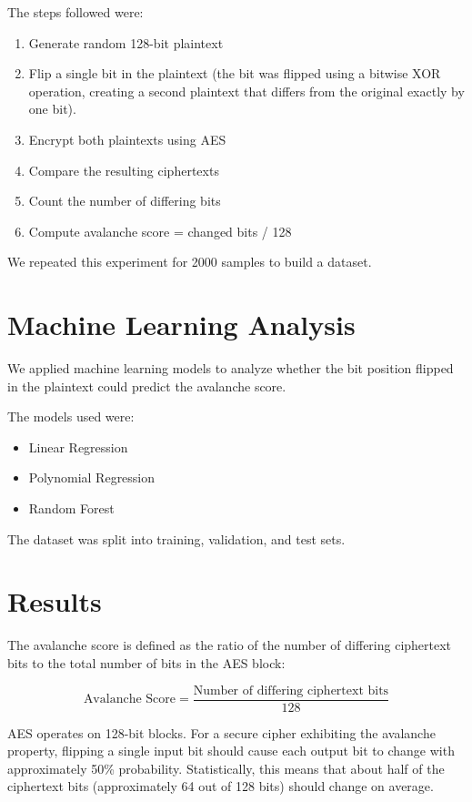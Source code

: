 \documentclass{article}
\begin{document}
The steps followed were:

\begin{enumerate}
\item Generate random 128-bit plaintext
\item Flip a single bit in the plaintext (the bit was flipped using a bitwise XOR operation, creating a second plaintext that differs from the original exactly by one bit).
\item Encrypt both plaintexts using AES
\item Compare the resulting ciphertexts
\item Count the number of differing bits
\item Compute avalanche score = changed bits / 128
\end{enumerate}

We repeated this experiment for 2000 samples to build a dataset.

\section{Machine Learning Analysis}

We applied machine learning models to analyze whether the bit position flipped in the plaintext could predict the avalanche score.

The models used were:

\begin{itemize}
\item Linear Regression
\item Polynomial Regression
\item Random Forest
\end{itemize}

The dataset was split into training, validation, and test sets.

\section{Results}

The avalanche score is defined as the ratio of the number of differing ciphertext bits to the total number of bits in the AES block:

\[
\text{Avalanche Score} = \frac{\text{Number of differing ciphertext bits}}{128}
\]

AES operates on 128-bit blocks. For a secure cipher exhibiting the avalanche property, flipping a single input bit should cause each output bit to change with approximately 50\% probability. Statistically, this means that about half of the ciphertext bits (approximately 64 out of 128 bits) should change on average.
\end{document}

